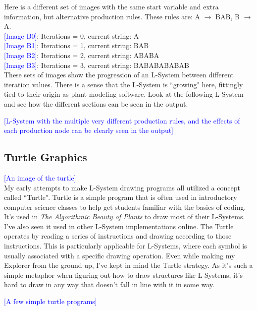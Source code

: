 \documentclass[12pt,twoside]{reedthesis}
\begin{document}
Here is a different set of images with the same start variable and extra information, but alternative production rules. These rules are: A $\rightarrow$ BAB, B $\rightarrow$ A.
\\\textcolor{blue}{[Image B0]}: Iterations = 0, current string: A
\\\textcolor{blue}{[Image B1]}: Iterations = 1, current string: BAB
\\\textcolor{blue}{[Image B2]}: Iterations = 2, current string: ABABA
\\\textcolor{blue}{[Image B3]}: Iterations = 3, current string: BABABABABAB\\

These sets of images show the progression of an L-System between different iteration values. There is a sense that the L-System is ``growing" here, fittingly tied to their origin as plant-modeling software. Look at the following L-System and see how the different sections can be seen in the output.

	\textcolor{blue}{[L-System with the multiple very different production rules, and the effects of each production node can be clearly seen in the output]}\\

\subsection{Turtle Graphics}

	\textcolor{blue}{[An image of the turtle]}\\

	My early attempts to make L-System drawing programs all utilized a concept called ``Turtle". Turtle is a simple program that is often used in introductory computer science classes to help get students familiar with the basics of coding. It's used in \textit{The Algorithmic Beauty of Plants} to draw most of their L-Systems. I've also seen it used in other L-System implementations online. The Turtle operates by reading a series of instructions and drawing according to those instructions. This is particularly applicable for L-Systems, where each symbol is usually associated with a specific drawing operation. Even while making my Explorer from the ground up, I've kept in mind the Turtle strategy. As it's such a simple metaphor when figuring out how to draw structures like L-Systems, it's hard to draw in any way that doesn't fall in line with it in some way.
	
	\textcolor{blue}{[A few simple turtle programs]}\\
	
\end{document}
